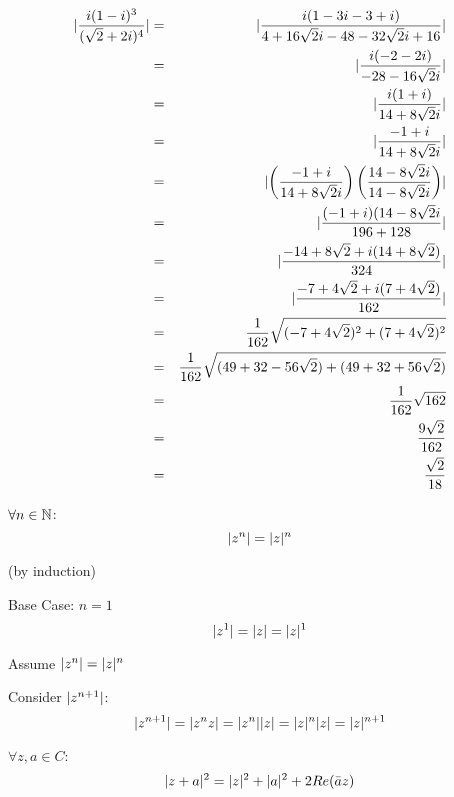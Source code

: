 \documentclass[letterpaper,12pt,fleqn]{article}
\newcommand{\conj}[1]{\bar{#1}}
\begin{document}
\begin{example}
\begin{eqnarray*}
\lvert\frac{i(1-i)^3}{(\sqrt{2}+2i)^4}\rvert &=&
    \lvert\frac{i(1-3i-3+i)}{4+16\sqrt{2}i-48-32\sqrt{2}i+16}\rvert \\
    &=& \lvert\frac{i(-2-2i)}{-28-16\sqrt{2}i}\rvert \\
    &=& \lvert\frac{i(1+i)}{14+8\sqrt{2}i}\rvert \\
    &=& \lvert\frac{-1+i}{14+8\sqrt{2}i}\rvert \\
    &=& \lvert\left(\frac{-1+i}{14+8\sqrt{2}i}\right)
        \left(\frac{14-8\sqrt{2}i}{14-8\sqrt{2}i}\right)\rvert \\
    &=& \lvert\frac{(-1+i)(14-8\sqrt{2}i}{196+128}\rvert \\
    &=& \lvert\frac{-14+8\sqrt{2}+i(14+8\sqrt{2})}{324}\rvert \\
    &=& \lvert\frac{-7+4\sqrt{2}+i(7+4\sqrt{2})}{162}\rvert \\
    &=& \frac{1}{162}\sqrt{(-7+4\sqrt{2})^2+(7+4\sqrt{2})^2} \\
    &=& \frac{1}{162}\sqrt{(49+32-56\sqrt{2})+(49+32+56\sqrt{2})} \\
    &=& \frac{1}{162}\sqrt{162} \\
    &=& \frac{9\sqrt{2}}{162} \\
    &=& \frac{\sqrt{2}}{18} \\
\end{eqnarray*}
\end{example}

\begin{theorem}
$\forall n\in\mathbb{N}$:
\[\lvert z^n\rvert=\lvert z\rvert^n\]
\end{theorem}

\begin{theproof}
(by induction)
\begin{description}
\item{Base Case: $n=1$} \\
\[\lvert z^1\rvert=\lvert z\rvert=\lvert z\rvert^1\]

\item Assume $\lvert z^n\rvert=\lvert z\rvert^n$

\item Consider $\lvert z^{n+1}\rvert$:
\[\lvert z^{n+1}\rvert=\lvert z^nz\rvert=\lvert z^n\rvert\lvert z\rvert=\lvert z\rvert^n\lvert z\rvert=\lvert z\rvert^{n+1}\]
\end{description}
\end{theproof}

\begin{theorem}
$\forall z,a\in C$:
\[\abs{z+a}^2=\abs{z}^2+\abs{a}^2+2Re(\conj{a}z)\]
\end{theorem}
\end{document}
